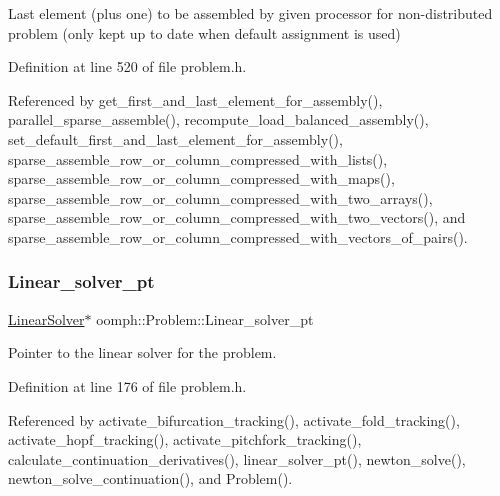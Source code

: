 Last element (plus one) to be assembled by given processor for non-\/distributed problem (only kept up to date when default assignment is used) 



Definition at line 520 of file problem.\+h.



Referenced by get\+\_\+first\+\_\+and\+\_\+last\+\_\+element\+\_\+for\+\_\+assembly(), parallel\+\_\+sparse\+\_\+assemble(), recompute\+\_\+load\+\_\+balanced\+\_\+assembly(), set\+\_\+default\+\_\+first\+\_\+and\+\_\+last\+\_\+element\+\_\+for\+\_\+assembly(), sparse\+\_\+assemble\+\_\+row\+\_\+or\+\_\+column\+\_\+compressed\+\_\+with\+\_\+lists(), sparse\+\_\+assemble\+\_\+row\+\_\+or\+\_\+column\+\_\+compressed\+\_\+with\+\_\+maps(), sparse\+\_\+assemble\+\_\+row\+\_\+or\+\_\+column\+\_\+compressed\+\_\+with\+\_\+two\+\_\+arrays(), sparse\+\_\+assemble\+\_\+row\+\_\+or\+\_\+column\+\_\+compressed\+\_\+with\+\_\+two\+\_\+vectors(), and sparse\+\_\+assemble\+\_\+row\+\_\+or\+\_\+column\+\_\+compressed\+\_\+with\+\_\+vectors\+\_\+of\+\_\+pairs().

\mbox{\label{classoomph_1_1Problem_a519de6f6f70c8b0f6bacbde5e0a35cd7}} 
\subsubsection{\texorpdfstring{Linear\+\_\+solver\+\_\+pt}{Linear\_solver\_pt}}
{\footnotesize\ttfamily \hyperlink{classoomph_1_1LinearSolver}{Linear\+Solver}$\ast$ oomph\+::\+Problem\+::\+Linear\+\_\+solver\+\_\+pt\hspace{0.3cm}{\ttfamily [private]}}



Pointer to the linear solver for the problem. 



Definition at line 176 of file problem.\+h.



Referenced by activate\+\_\+bifurcation\+\_\+tracking(), activate\+\_\+fold\+\_\+tracking(), activate\+\_\+hopf\+\_\+tracking(), activate\+\_\+pitchfork\+\_\+tracking(), calculate\+\_\+continuation\+\_\+derivatives(), linear\+\_\+solver\+\_\+pt(), newton\+\_\+solve(), newton\+\_\+solve\+\_\+continuation(), and Problem().

